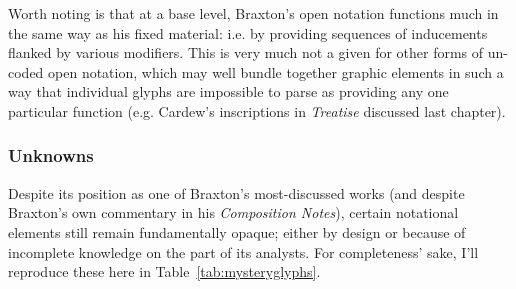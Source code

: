         Worth noting is that at a base level, Braxton's open notation functions much in the same way as his fixed material: i.e. by providing sequences of inducements flanked by various modifiers. This is very much not a given for other forms of un-coded open notation, which may well bundle together graphic elements in such a way that individual glyphs are impossible to parse as providing any one particular function (e.g. Cardew's inscriptions in \textit{Treatise} discussed last chapter).



    \subsubsection{Unknowns}

        Despite its position as one of Braxton's most-discussed works (and despite Braxton's own commentary in his \textit{Composition Notes}), certain notational elements still remain fundamentally opaque; either by design or because of incomplete knowledge on the part of its analysts. For completeness' sake, I'll reproduce these here in Table~\ref{tab:mysteryglyphs}.

